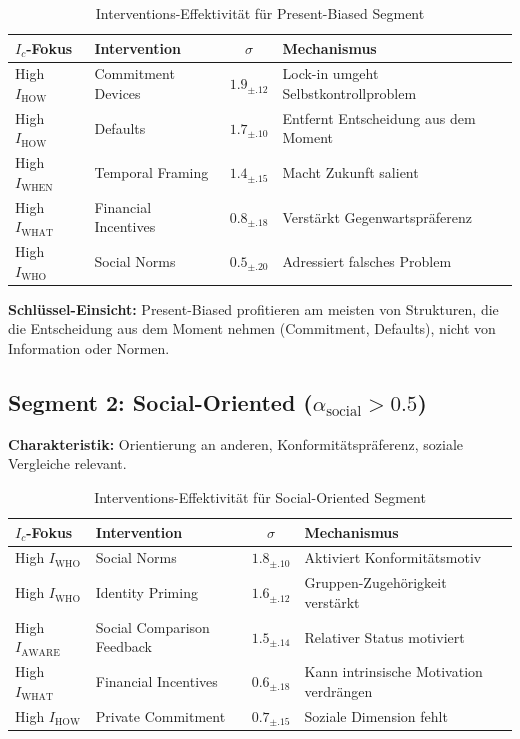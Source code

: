 \begin{table}[htbp]
\centering
\caption{Interventions-Effektivität für Present-Biased Segment}
\label{tab:19-present-biased}
\renewcommand{\arraystretch}{1.3}
\small
\begin{tabular}{@{}llcp{5cm}@{}}
\toprule
\textbf{$I_c$-Fokus} & \textbf{Intervention} & \textbf{$\sigma$} & \textbf{Mechanismus} \\
\midrule
High $I_{\text{HOW}}$ & Commitment Devices & \cellcolor{green!25}$1.9_{\pm.12}$ & Lock-in umgeht Selbstkontrollproblem \\
High $I_{\text{HOW}}$ & Defaults & \cellcolor{green!25}$1.7_{\pm.10}$ & Entfernt Entscheidung aus dem Moment \\
High $I_{\text{WHEN}}$ & Temporal Framing & $1.4_{\pm.15}$ & Macht Zukunft salient \\
High $I_{\text{WHAT}}$ & Financial Incentives & $0.8_{\pm.18}$ & Verst\"{a}rkt Gegenwartspr\"{a}ferenz \\
High $I_{\text{WHO}}$ & Social Norms & $0.5_{\pm.20}$ & Adressiert falsches Problem \\
\bottomrule
\end{tabular}
\end{table}

\textbf{Schlüssel-Einsicht:} Present-Biased profitieren am meisten von Strukturen, die die Entscheidung aus dem Moment nehmen (Commitment, Defaults), nicht von Information oder Normen.

\subsection{Segment 2: Social-Oriented ($\alpha_{\text{social}} > 0.5$)}

\textbf{Charakteristik:} Orientierung an anderen, Konformitätspräferenz, soziale Vergleiche relevant.

\begin{table}[htbp]
\centering
\caption{Interventions-Effektivität für Social-Oriented Segment}
\label{tab:19-social-oriented}
\renewcommand{\arraystretch}{1.3}
\small
\begin{tabular}{@{}llcp{5cm}@{}}
\toprule
\textbf{$I_c$-Fokus} & \textbf{Intervention} & \textbf{$\sigma$} & \textbf{Mechanismus} \\
\midrule
High $I_{\text{WHO}}$ & Social Norms & \cellcolor{green!25}$1.8_{\pm.10}$ & Aktiviert Konformit\"{a}tsmotiv \\
High $I_{\text{WHO}}$ & Identity Priming & \cellcolor{green!25}$1.6_{\pm.12}$ & Gruppen-Zugeh\"{o}rigkeit verst\"{a}rkt \\
High $I_{\text{AWARE}}$ & Social Comparison Feedback & $1.5_{\pm.14}$ & Relativer Status motiviert \\
High $I_{\text{WHAT}}$ & Financial Incentives & $0.6_{\pm.18}$ & Kann intrinsische Motivation verdr\"{a}ngen \\
High $I_{\text{HOW}}$ & Private Commitment & $0.7_{\pm.15}$ & Soziale Dimension fehlt \\
\bottomrule
\end{tabular}
\end{table}


